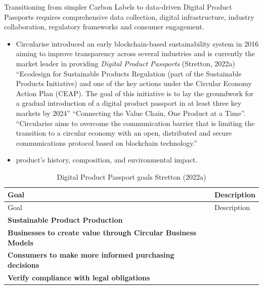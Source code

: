 \documentclass[
  letterpaper,
  DIV=11,
  numbers=noendperiod]{scrartcl}
\providecommand{\tightlist}{%
  \setlength{\itemsep}{0pt}\setlength{\parskip}{0pt}}\usepackage{longtable,booktabs,array}
\begin{document}
Transitioning from simpler Carbon Labels to data-driven Digital Product
Passports requires comprehensive data collection, digital
infrastructure, industry collaboration, regulatory frameworks and
consumer engagement.

\begin{itemize}
\tightlist
\item
  Circularise introduced an early blockchain-based sustainability system
  in 2016 aiming to improve transparency across several industries and
  is currently the market leader in providing \emph{Digital Product
  Passports} (Stretton, 2022a) ``Ecodesign for Sustainable Products
  Regulation (part of the Sustainable Products Initiative) and one of
  the key actions under the Circular Economy Action Plan (CEAP). The
  goal of this initiative is to lay the groundwork for a gradual
  introduction of a digital product passport in at least three key
  markets by 2024'' ``Connecting the Value Chain, One Product at a
  Time''. ``Circularise aims to overcome the communication barrier that
  is limiting the transition to a circular economy with an open,
  distributed and secure communications protocol based on blockchain
  technology.''
\item
  product's history, composition, and environmental impact.
\end{itemize}

\begin{longtable}[]{@{}
  >{\raggedright\arraybackslash}p{}
  >{\raggedright\arraybackslash}p{}@{}}
\caption{Digital Product Passport goals Stretton (2022a)}\tabularnewline
\toprule\noalign{}
\begin{minipage}[b]{\linewidth}\raggedright
Goal
\end{minipage} & \begin{minipage}[b]{\linewidth}\raggedright
Description
\end{minipage} \\
\midrule\noalign{}
\endfirsthead
\toprule\noalign{}
\begin{minipage}[b]{\linewidth}\raggedright
Goal
\end{minipage} & \begin{minipage}[b]{\linewidth}\raggedright
Description
\end{minipage} \\
\midrule\noalign{}
\endhead
\bottomrule\noalign{}
\endlastfoot
\textbf{Sustainable Product Production} & \\
\textbf{Businesses to create value through Circular Business Models}
& \\
\textbf{Consumers to make more informed purchasing decisions} & \\
\textbf{Verify compliance with legal obligations} & \\
\end{longtable}
\end{document}
